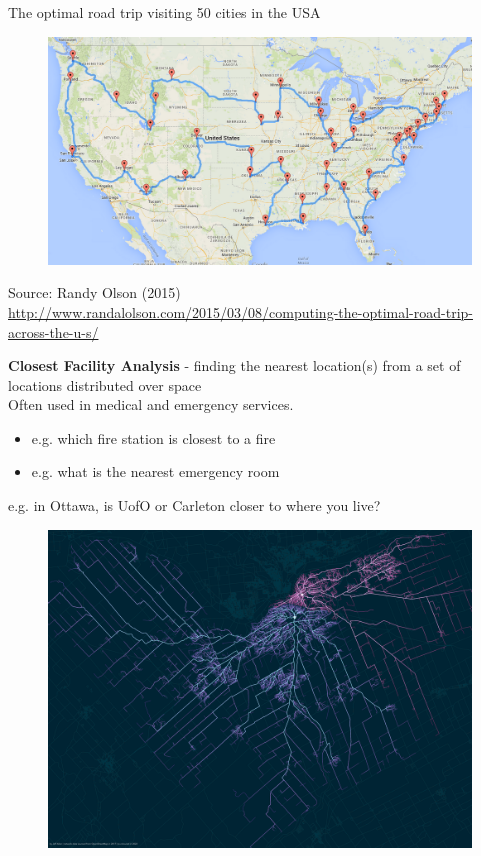 \documentclass[aspectratio=169]{beamer}
\begin{document}
\begin{frame}
	\small The optimal road trip visiting 50 cities in the USA
	\begin{figure}
		\centering
		\includegraphics[width=0.9\linewidth]{images/travel_usa}
	\end{figure}
	
	\tiny Source: Randy Olson (2015)  \url{http://www.randalolson.com/2015/03/08/computing-the-optimal-road-trip-across-the-u-s/}
\end{frame}	




\begin{frame}

	\textbf{Closest Facility Analysis} - finding the nearest location(s) from a set of locations distributed over space \\
	\vspace{3mm}
	Often used in medical and emergency services. 
	\begin{itemize}
		\item e.g. which fire station is closest to a fire
		\item e.g. what is the nearest emergency room
	\end{itemize}
\end{frame}



\begin{frame}
	
	e.g. in Ottawa, is UofO or Carleton closer to where you live?
	
	\begin{figure}
		\centering
		\includegraphics[width=0.79\linewidth]{images/ottawa_2c.png}
	\end{figure}
	\tiny \url{}
\end{frame}
\end{document}
